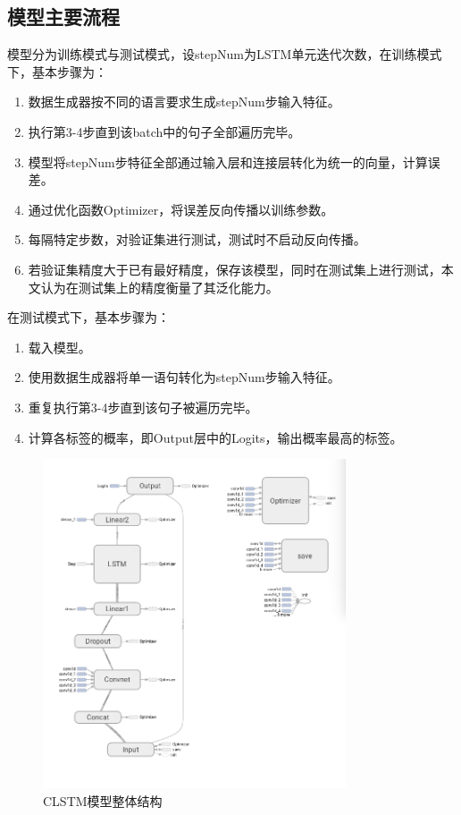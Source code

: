 \subsection{模型主要流程}
模型分为训练模式与测试模式，设stepNum为LSTM单元迭代次数，在训练模式下，基本步骤为：\par
\begin{enumerate}
\item 数据生成器按不同的语言要求生成stepNum步输入特征。
\item 执行第3-4步直到该batch中的句子全部遍历完毕。
\item 模型将stepNum步特征全部通过输入层和连接层转化为统一的向量，计算误差。
\item 通过优化函数Optimizer，将误差反向传播以训练参数。
\item 每隔特定步数，对验证集进行测试，测试时不启动反向传播。
\item 若验证集精度大于已有最好精度，保存该模型，同时在测试集上进行测试，本文认为在测试集上的精度衡量了其泛化能力。
\end{enumerate}
在测试模式下，基本步骤为：\par
\begin{enumerate}
\item 载入模型。
\item 使用数据生成器将单一语句转化为stepNum步输入特征。
\item 重复执行第3-4步直到该句子被遍历完毕。
\item 计算各标签的概率，即Output层中的Logits，输出概率最高的标签。
\end{enumerate}
\begin{figure}[!hbp]
\begin{center}
\includegraphics[width=0.8\textwidth]{graphic/clstm1.png}
\caption{CLSTM模型整体结构 \label{clstm1}}
\end{center}
\end{figure}
